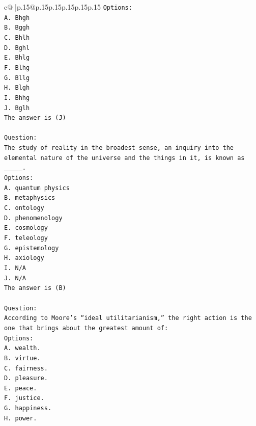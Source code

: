 \documentclass{article}
\begin{document}
{\begin{supertabular}{c@{$\;$}|p{.15\linewidth}@{}p{.15\linewidth}p{.15\linewidth}p{.15\linewidth}p{.15\linewidth}p{.15\linewidth}}
{{{\texttt{Options:} \\
\texttt{A. Bhgh} \\
\texttt{B. Bggh} \\
\texttt{C. Bhlh} \\
\texttt{D. Bghl} \\
\texttt{E. Bhlg} \\
\texttt{F. Blhg} \\
\texttt{G. Bllg} \\
\texttt{H. Blgh} \\
\texttt{I. Bhhg} \\
\texttt{J. Bglh} \\
\texttt{The answer is (J)} \\
\\ 
\texttt{Question:} \\
\texttt{The study of reality in the broadest sense, an inquiry into the elemental nature of the universe and the things in it, is known as \_\_\_\_\_.} \\
\texttt{Options:} \\
\texttt{A. quantum physics} \\
\texttt{B. metaphysics} \\
\texttt{C. ontology} \\
\texttt{D. phenomenology} \\
\texttt{E. cosmology} \\
\texttt{F. teleology} \\
\texttt{G. epistemology} \\
\texttt{H. axiology} \\
\texttt{I. N/A} \\
\texttt{J. N/A} \\
\texttt{The answer is (B)} \\
\\ 
\texttt{Question:} \\
\texttt{According to Moore’s “ideal utilitarianism,” the right action is the one that brings about the greatest amount of:} \\
\texttt{Options:} \\
\texttt{A. wealth.} \\
\texttt{B. virtue.} \\
\texttt{C. fairness.} \\
\texttt{D. pleasure.} \\
\texttt{E. peace.} \\
\texttt{F. justice.} \\
\texttt{G. happiness.} \\
\texttt{H. power.} \\
}}}
\end{supertabular}}
\end{document}
